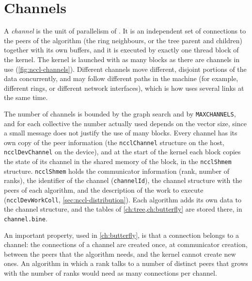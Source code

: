 \section{Channels}\label{sec:nccl-channels}

A \emph{channel} is the unit of parallelism of \nccl{}.
It is an independent set of connections to the peers of the algorithm (the ring neighbours, or the tree parent and children) together with its own buffers, and it is executed by exactly one thread block of the kernel. The kernel is launched with as many blocks as there are channels in use (\cref{fig:nccl-channels}).
Different channels move different, disjoint portions of the data concurrently, and may follow different paths in the machine (for example, different rings, or different network interfaces), which is how \nccl{} uses several links at the same time.

The number of channels is bounded by the graph search and by \texttt{MAXCHANNELS}, and for each collective the number actually used depends on the vector size, since a small message does not justify the use of many blocks.
Every channel has its own copy of the peer information (the \texttt{ncclChannel} structure on the host, \texttt{ncclDevChannel} on the device), and at the start of the kernel each block copies the state of its channel in the shared memory of the block, in the \texttt{ncclShmem} structure.
\texttt{ncclShmem} holds the communicator information (rank, number of ranks), the identifier of the channel (\texttt{channelId}), the channel structure with the peers of each algorithm, and the description of the work to execute (\texttt{ncclDevWorkColl}, \cref{sec:nccl-distribution}).
Each algorithm adds its own data to the channel structure, and the \bine{} tables of \cref{ch:tree,ch:butterfly} are stored there, in \texttt{channel.bine}.

An important property, used in \cref{ch:butterfly}, is that a connection belongs to a channel: the connections of a channel are created once, at communicator creation, between the peers that the algorithm needs, and the kernel cannot create new ones.
An algorithm in which a rank talks to a number of distinct peers that grows with the number of ranks would need as many connections per channel.

